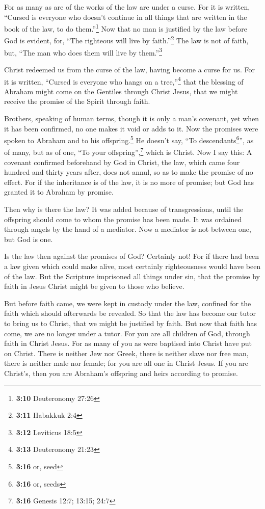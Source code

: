 For as many as are of the works of the law are under a
curse. For it is written, ``Cursed is everyone who doesn't continue in
all things that are written in the book of the law, to do
them.''\footnote{\textbf{3:10} Deuteronomy 27:26}  Now
that no man is justified by the law before God is evident, for, ``The
righteous will live by faith.''\footnote{\textbf{3:11} Habakkuk 2:4}
 The law is not of faith, but, ``The man who does them
will live by them.''\footnote{\textbf{3:12} Leviticus 18:5}

 Christ redeemed us from the curse of the law, having
become a curse for us. For it is written, ``Cursed is everyone who hangs
on a tree,''\footnote{\textbf{3:13} Deuteronomy 21:23} 
that the blessing of Abraham might come on the Gentiles through Christ
Jesus, that we might receive the promise of the Spirit through faith.

 Brothers, speaking of human terms, though it is only a
man's covenant, yet when it has been confirmed, no one makes it void or
adds to it.  Now the promises were spoken to Abraham and
to his offspring.\footnote{\textbf{3:16} or, seed} He doesn't say, ``To
descendants\footnote{\textbf{3:16} or, seeds}'', as of many, but as of
one, ``To your offspring'',\footnote{\textbf{3:16} Genesis 12:7; 13:15;
  24:7} which is Christ.  Now I say this: A covenant
confirmed beforehand by God in Christ, the law, which came four hundred
and thirty years after, does not annul, so as to make the promise of no
effect.  For if the inheritance is of the law, it is no
more of promise; but God has granted it to Abraham by promise.

 Then why is there the law? It was added because of
transgressions, until the offspring should come to whom the promise has
been made. It was ordained through angels by the hand of a mediator.
 Now a mediator is not between one, but God is one.

 Is the law then against the promises of God? Certainly
not! For if there had been a law given which could make alive, most
certainly righteousness would have been of the law.  But
the Scripture imprisoned all things under sin, that the promise by faith
in Jesus Christ might be given to those who believe.

 But before faith came, we were kept in custody under the
law, confined for the faith which should afterwards be revealed.
 So that the law has become our tutor to bring us to
Christ, that we might be justified by faith.  But now
that faith has come, we are no longer under a tutor.  For
you are all children of God, through faith in Christ Jesus.
 For as many of you as were baptised into Christ have put
on Christ.  There is neither Jew nor Greek, there is
neither slave nor free man, there is neither male nor female; for you
are all one in Christ Jesus.  If you are Christ's, then
you are Abraham's offspring and heirs according to promise.

